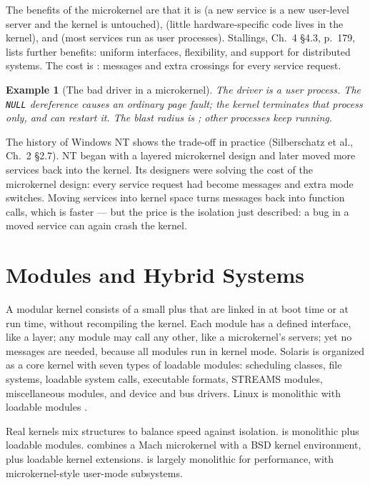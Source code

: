 \documentclass[11pt]{article}
\newtheorem{example}{Example}
\begin{document}
The benefits of the microkernel are that it is  (a new service
is a new user-level server and the kernel is untouched), 
(little hardware-specific code lives in the kernel), and  (most services run as user processes). Stallings, Ch.~4 \S4.3,
p.~179, lists further benefits: uniform interfaces, flexibility, and support
for distributed systems. The cost is : messages and extra
crossings for every service request.

\begin{example}[The bad driver in a microkernel]
The driver is a \emph{user process}. The \texttt{NULL} dereference causes an
ordinary page fault; the kernel terminates that process only, and can restart
it. The blast radius is ; other processes keep
running.
\end{example}

The history of Windows NT shows the trade-off in practice (Silberschatz et al.,
Ch.~2 \S2.7). NT began with a layered microkernel design and later moved more
services back into the kernel. Its designers were solving the cost of the
microkernel design: every service request had become messages and extra mode
switches. Moving services into kernel space turns messages back into function
calls, which is faster --- but the price is the isolation just described: a bug
in a moved service can again crash the kernel.

\section{Modules and Hybrid Systems}

\noindent{}

A modular kernel consists of a small  plus  that are linked in at boot time or at run time, without recompiling
the kernel. Each module has a defined interface, like a layer; any module may
call any other, like a microkernel's servers; yet no messages are needed,
because all modules run in kernel mode. Solaris is organized as a core kernel
with seven types of loadable modules: scheduling classes, file systems,
loadable system calls, executable formats, STREAMS modules, miscellaneous
modules, and device and bus drivers. Linux is monolithic with loadable modules
\cite{BovetCesati_understanding_linux_kernel}.

Real kernels mix structures to balance speed against isolation.  is
monolithic plus loadable modules.  combines a Mach microkernel
with a BSD kernel environment, plus loadable kernel extensions.
 is largely monolithic for performance, with microkernel-style
user-mode subsystems.
\end{document}
